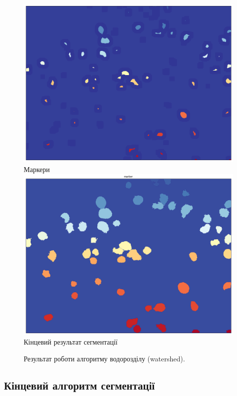 \begin{figure}[t!]
	\centering	
	\includegraphics[width=0.95\linewidth]{Figures/Chapter2/5a.png}
	Маркери
	\endminipage\hfill
	\centering	
	\includegraphics[width=0.95\linewidth]{Figures/Chapter2/5b.png}
	Кінцевий результат сегментації
	\endminipage\hfill
	
	\caption{Результат роботи алгоритму водорозділу (watershed).}
	\label{fig:watershed}
\end{figure}

\subsection{Кінцевий алгоритм сегментації}

